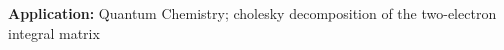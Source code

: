 \documentclass[]{finalproject}
\begin{document}
\begin{flushleft}
\textbf{Application:} Quantum Chemistry; cholesky decomposition of the two-electron integral matrix \cite{cholesky_application} \newline

\end{flushleft}
\end{document}
